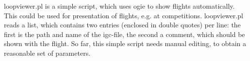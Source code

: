loopviewer.pl is a simple script, which uses ogie to show flights automatically.
This could be used for presentation of flights, e.g. at competitions.
loopviewer.pl reads a list, which contains two entries (enclosed in double quotes) per line:
the first is the path and name of the igc-file, the second a comment, which should be shown with the flight.
So far, this simple script needs manual editing, to obtain a reasonable set of parameters.


